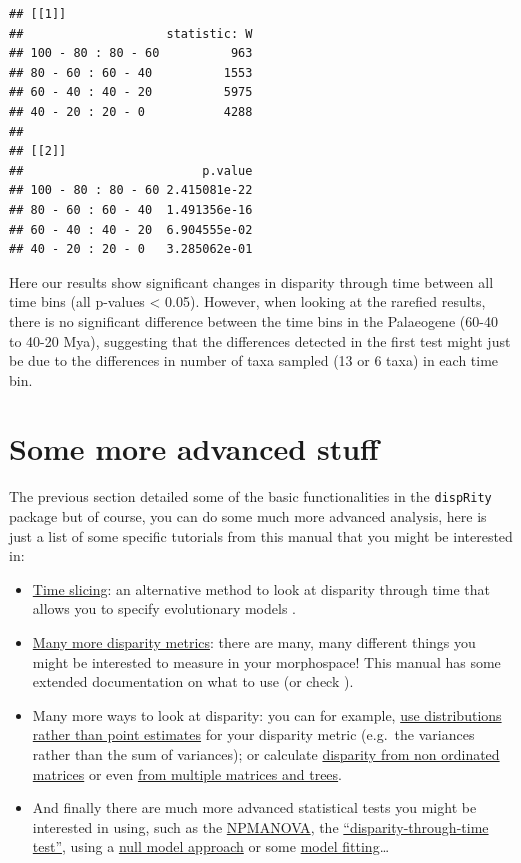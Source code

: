 \documentclass[]{book}
\providecommand{\tightlist}{%
  \setlength{\itemsep}{0pt}\setlength{\parskip}{0pt}}
\begin{document}
\begin{verbatim}
## [[1]]
##                    statistic: W
## 100 - 80 : 80 - 60          963
## 80 - 60 : 60 - 40          1553
## 60 - 40 : 40 - 20          5975
## 40 - 20 : 20 - 0           4288
## 
## [[2]]
##                         p.value
## 100 - 80 : 80 - 60 2.415081e-22
## 80 - 60 : 60 - 40  1.491356e-16
## 60 - 40 : 40 - 20  6.904555e-02
## 40 - 20 : 20 - 0   3.285062e-01
\end{verbatim}

Here our results show significant changes in disparity through time between all time bins (all p-values \textless{} 0.05).
However, when looking at the rarefied results, there is no significant difference between the time bins in the Palaeogene (60-40 to 40-20 Mya), suggesting that the differences detected in the first test might just be due to the differences in number of taxa sampled (13 or 6 taxa) in each time bin.

\hypertarget{some-more-advanced-stuff}{%
\section{Some more advanced stuff}\label{some-more-advanced-stuff}}

The previous section detailed some of the basic functionalities in the \texttt{dispRity} package but of course, you can do some much more advanced analysis, here is just a list of some specific tutorials from this manual that you might be interested in:

\begin{itemize}
\tightlist
\item
  \protect\hyperlink{time-slicing}{Time slicing}: an alternative method to look at disparity through time that allows you to specify evolutionary models \citep{time-slice}.
\item
  \protect\hyperlink{disparity-metrics}{Many more disparity metrics}: there are many, many different things you might be interested to measure in your morphospace! This manual has some extended documentation on what to use (or check \citet{moms}).
\item
  Many more ways to look at disparity: you can for example, \protect\hyperlink{disparity-distribution}{use distributions rather than point estimates} for your disparity metric (e.g.~the variances rather than the sum of variances); or calculate \protect\hyperlink{other-matrices}{disparity from non ordinated matrices} or even \protect\hyperlink{multi.input}{from multiple matrices and trees}.
\item
  And finally there are much more advanced statistical tests you might be interested in using, such as the \protect\hyperlink{adonis}{NPMANOVA}, the \protect\hyperlink{dtt}{``disparity-through-time test''}, using a \protect\hyperlink{null-test}{null model approach} or some \protect\hyperlink{model-fitting}{model fitting}\ldots{}
\end{itemize}
\end{document}
